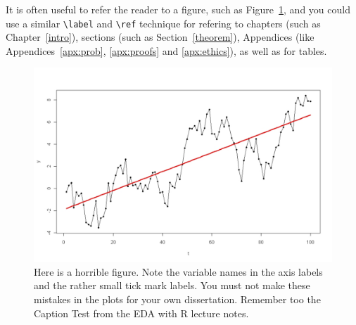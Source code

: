 \documentclass{somasmsc}
\begin{document}
It is often useful to refer the reader to a figure, such as Figure~\ref{Fig:Rwalk}, and you could use a similar \verb+\label+ and \verb+\ref+ technique for refering to chapters (such as Chapter~\ref{intro}), sections (such as Section~\ref{theorem}), Appendices (like Appendices~\ref{apx:prob}, \ref{apx:proofs} and \ref{apx:ethics}), as well as for tables.
\begin{figure}
\begin{center}
\includegraphics[width=12cm]{Rwalk.pdf}
\end{center}
\caption{Here is a horrible figure.  Note the variable names in the axis labels and the rather small tick mark labels. You must not make these mistakes in the plots for your own dissertation. Remember too the Caption Test from the EDA with R lecture notes.}
\label{Fig:Rwalk}
\end{figure}





\backmatter
\renewcommand{\bibname}{References}



\end{document}

